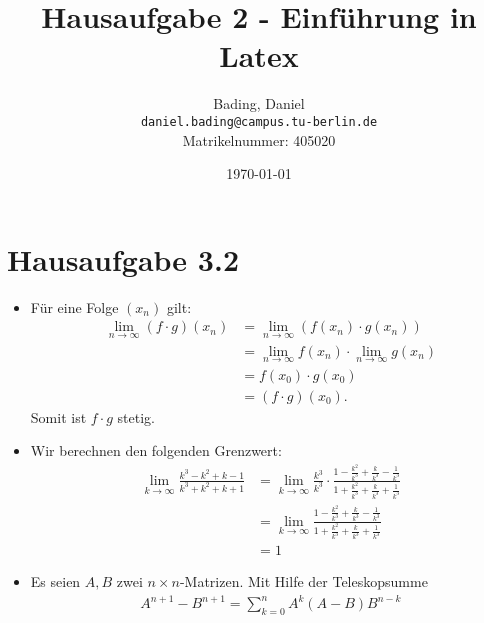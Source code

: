 \documentclass{article}
\title{Hausaufgabe 2 - Einführung in Latex}
\author{
  Bading, Daniel\\
  \texttt{daniel.bading@campus.tu-berlin.de}\\
  Matrikelnummer: 405020
  }
\date{\today}
\begin{document}
\maketitle

\newpage

\tableofcontents

\newpage


\section{Hausaufgabe 3.2}
\begin{itemize}
\item Für eine Folge $(x_n)$ gilt: 
\begin{align*}
\lim\limits_{n \to \infty} (f \cdot g) (x_n) 
&= \lim\limits_{n \to \infty} (f(x_n) \cdot g(x_n)) \\ 
&= \lim\limits_{n \to \infty} f(x_n) \cdot \lim\limits_{n \to \infty}g(x_n) \\
&= f(x_0) \cdot g(x_0) \\
&= (f \cdot g) (x_0). 
\end{align*}
Somit ist $f \cdot g$ stetig.
\item Wir berechnen den folgenden Grenzwert:
\begin{align}
\lim\limits_{k \to \infty} \frac{k^3 - k^2 + k - 1}{k^3 + k^2 + k + 1} 
&= \lim\limits_{k \to \infty} \frac{k^3}{k^3} \cdot \frac{1 - \frac{k^2}{k^3} + \frac{k}{k^3} - \frac{1}{k^3}}{1 + \frac{k^2}{k^3} + \frac{k}{k^3} + \frac{1}{k^3}} \\
&= \lim\limits_{k \to \infty} \frac{1 - \frac{k^2}{k^3} + \frac{k}{k^3} - \frac{1}{k^3}}{1 + \frac{k^2}{k^3} + \frac{k}{k^3} + \frac{1}{k^3}} \\
&= 1
\end{align}
\item Es seien $A,B$ zwei $n \times n$-Matrizen. Mit Hilfe der Teleskopsumme 
\begin{align*}
\tag{TKS}
A^{n+1} - B^{n+1} = \sum\limits_{k = 0}^{n} A^k (A-B) B^{n-k}
\end{align*}
\end{itemize}
\end{document}
